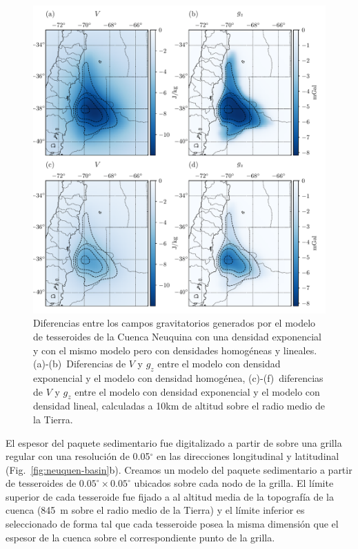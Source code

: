 \begin{figure}
\centering
\includegraphics[width=\linewidth]{
    figs/tesseroids-variable-density/neuquen-basin-diffs.pdf
}
\caption{
    Diferencias entre los campos gravitatorios generados por el modelo de
    tesseroides de la Cuenca Neuquina con una densidad exponencial y con el
    mismo modelo pero con densidades homogéneas y lineales.
    \mbox{(a)-(b)}~Diferencias de $V$ y $g_z$ entre el modelo con densidad
    exponencial y el modelo con densidad homogénea,
    \mbox{(c)-(f)}~diferencias de $V$ y $g_z$ entre el modelo con densidad
    exponencial y el modelo con densidad lineal,
    calculadas a 10km de altitud sobre el radio medio de la Tierra.
}
\label{fig:neuquen-basin-diffs}
\end{figure}

El espesor del paquete sedimentario fue digitalizado a partir de \citet{heine2007}
sobre una grilla regular con una resolución de 0.05$^\circ$ en las direcciones
longitudinal y latitudinal (Fig.~\ref{fig:neuquen-basin}b).
Creamos un modelo del paquete sedimentario a partir de tesseroides de
$0.05^\circ \times 0.05^\circ$ ubicados sobre cada nodo de la grilla.
El límite superior de cada tesseroide fue fijado a al altitud media de la
topografía de la cuenca (845~m sobre el radio medio de la Tierra) y el límite
inferior es seleccionado de forma tal que cada tesseroide posea la misma
dimensión que el espesor de la cuenca sobre el correspondiente punto de la
grilla.

